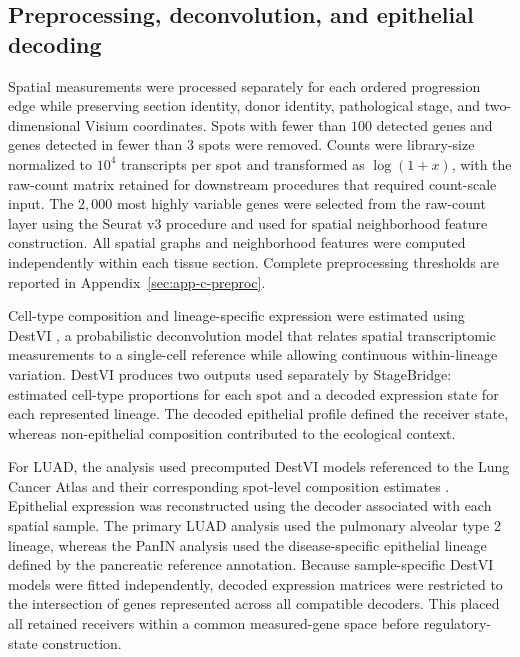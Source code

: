 \subsection{Preprocessing, deconvolution, and epithelial decoding}
\label{sec:methods-spatial-preprocessing}
\label{sec:methods-destvi}

Spatial measurements were processed separately for each ordered progression edge while preserving section identity, donor identity, pathological stage, and two-dimensional Visium coordinates. Spots with fewer than \(100\) detected genes and genes detected in fewer than \(3\) spots were removed. Counts were
library-size normalized to \(10^{4}\) transcripts per spot and transformed as
\(\log(1+x)\), with the raw-count matrix retained for downstream procedures that required count-scale input. The \(2{,}000\) most highly variable genes were
selected from the raw-count layer using the Seurat v3 procedure and used for spatial neighborhood feature construction. All spatial graphs and neighborhood
features were computed independently within each tissue section. Complete preprocessing thresholds are reported in
Appendix~\ref{sec:app-c-preproc}.

Cell-type composition and lineage-specific expression were estimated using DestVI \autocite{Lopez2022-ps}, a probabilistic deconvolution model that relates spatial transcriptomic measurements to a single-cell reference while allowing
continuous within-lineage variation. DestVI produces two outputs used separately by StageBridge: estimated cell-type proportions for each spot and a
decoded expression state for each represented lineage. The decoded epithelial profile defined the receiver state, whereas non-epithelial composition
contributed to the ecological context.

For LUAD, the analysis used precomputed DestVI models referenced to the Lung
Cancer Atlas and their corresponding spot-level composition estimates
\autocite{Salcher2022-pu}. Epithelial expression was reconstructed using the
decoder associated with each spatial sample. The primary LUAD analysis used the pulmonary alveolar type 2 lineage, whereas the PanIN analysis used the
disease-specific epithelial lineage defined by the pancreatic reference
annotation. Because sample-specific DestVI models were fitted independently, decoded expression matrices were restricted to the intersection of genes represented across all compatible decoders. This placed all retained receivers
within a common measured-gene space before regulatory-state construction.

